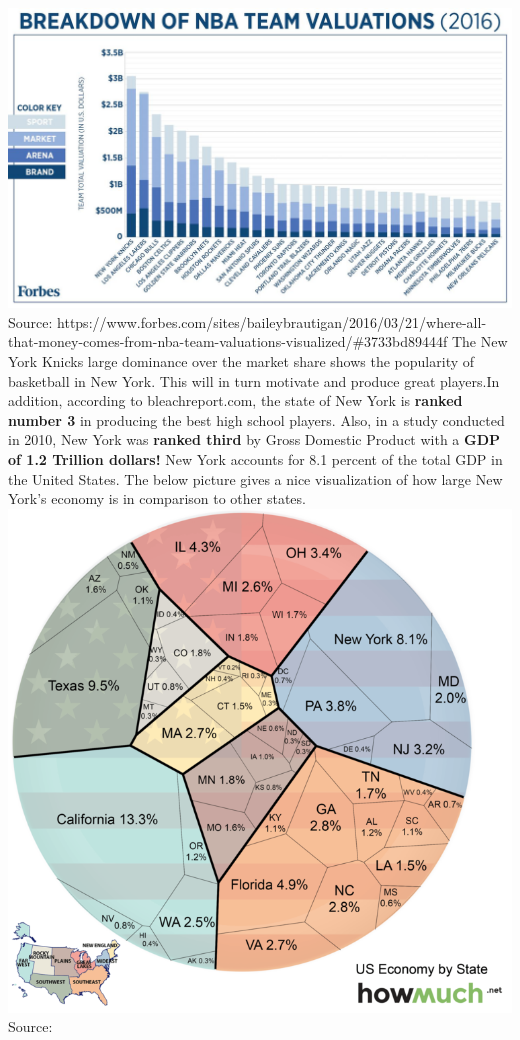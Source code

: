 \documentclass[11pt]{article}
\makeatletter
\def\maxwidth{\ifdim\Gin@nat@width>\linewidth\linewidth
    \else\Gin@nat@width\fi}
\let\Oldincludegraphics\includegraphics
\renewcommand{\includegraphics}[1]{\Oldincludegraphics[width=.8\maxwidth]{#1}}
\makeatother
\begin{document}
\includegraphics{knicks_income.png} \newline
Source:
https://www.forbes.com/sites/baileybrautigan/2016/03/21/where-all-that-money-comes-from-nba-team-valuations-visualized/\#3733bd89444f
\newline
\newline
The New York Knicks large dominance over the market share shows the
popularity of basketball in New York. This will in turn motivate and
produce great players.In addition, according to bleachreport.com, the
state of New York is \textbf{ranked number 3} in producing the best high
school players. Also, in a study conducted in 2010, New York was
\textbf{ranked third} by Gross Domestic Product with a \textbf{GDP of
1.2 Trillion dollars!} New York accounts for 8.1 percent of the total
GDP in the United States. The below picture gives a nice visualization
of how large New York's economy is in comparison to other states.
\newline  \newline
\includegraphics{ny_gdp.png} \newline  Source:
\end{document}
